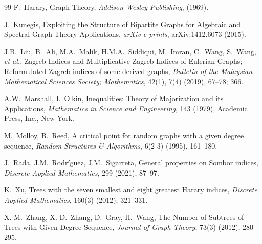 \documentclass[12pt]{amsart}
\begin{document}
\begin{thebibliography}{99}
F.~Harary,
\newblock Graph Theory,
\newblock \emph{Addison-Wesley Publishing}, (1969).

J.~Kunegis,
\newblock Exploiting the Structure of Bipartite Graphs for Algebraic and Spectral Graph Theory Applications,
\newblock \emph{arXiv e-prints}, arXiv:1412.6073 (2015).

J.B.~Liu, B.~Ali, M.A.~Malik, H.M.A.~Siddiqui, M.~Imran, C.~Wang, S.~Wang, \emph{et al.},
\newblock Zagreb Indices and Multiplicative Zagreb Indices of Eulerian Graphs; Reformulated Zagreb indices of some derived graphs,
\newblock \emph{Bulletin of the Malaysian Mathematical Sciences Society; Mathematics}, 42(1), 7(4) (2019), 67–78; 366.

A.W.~Marshall, I.~Olkin,
\newblock Inequalities: Theory of Majorization and its Applications,
\newblock \emph{Mathematics in Science and Engineering}, 143 (1979), Academic Press, Inc., New York.

M.~Molloy, B.~Reed,
\newblock A critical point for random graphs with a given degree sequence,
\newblock \emph{Random Structures \& Algorithms}, 6(2-3) (1995), 161–180.

J.~Rada, J.M.~Rodr\'iguez, J.M.~Sigarreta,
\newblock General properties on Sombor indices,
\newblock \emph{Discrete Applied Mathematics}, 299 (2021), 87–97.

K.~Xu,
\newblock Trees with the seven smallest and eight greatest Harary indices,
\newblock \emph{Discrete Applied Mathematics}, 160(3) (2012), 321–331.

X.-M.~Zhang, X.-D.~Zhang, D.~Gray, H.~Wang,
\newblock The Number of Subtrees of Trees with Given Degree Sequence,
\newblock \emph{Journal of Graph Theory}, 73(3) (2012), 280–295.



\end{thebibliography}
 
\end{document}
